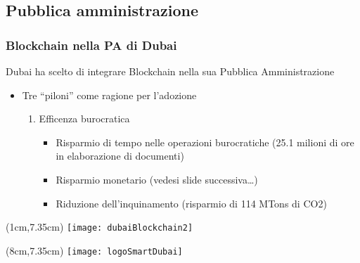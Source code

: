 \subsection{Pubblica amministrazione}
\begin{frame}
 \frametitle{Blockchain nella PA di Dubai}

 Dubai ha scelto di integrare Blockchain nella sua Pubblica Amministrazione
 \begin{itemize}
  \item<1-> Tre ``piloni'' come ragione per l'adozione
  \begin{enumerate}
   \item<2-> Efficenza burocratica
   \begin{itemize}
   \item<3-> Risparmio di tempo nelle operazioni burocratiche (25.1 milioni di
ore in elaborazione di documenti)
   \item<4-> Risparmio monetario (vedesi slide successiva\dots)
   \item<5-> Riduzione dell'inquinamento (risparmio di 114 MTons di CO2)
  \end{itemize}
  \end{enumerate}

 \end{itemize}


 \begin{textblock*}{5cm}(1cm,7.35cm)
  \texttt{[image: dubaiBlockchain2]}
 \end{textblock*}

 \begin{textblock*}{5cm}(8cm,7.35cm)
  \texttt{[image: logoSmartDubai]}
 \end{textblock*}

\end{frame}

